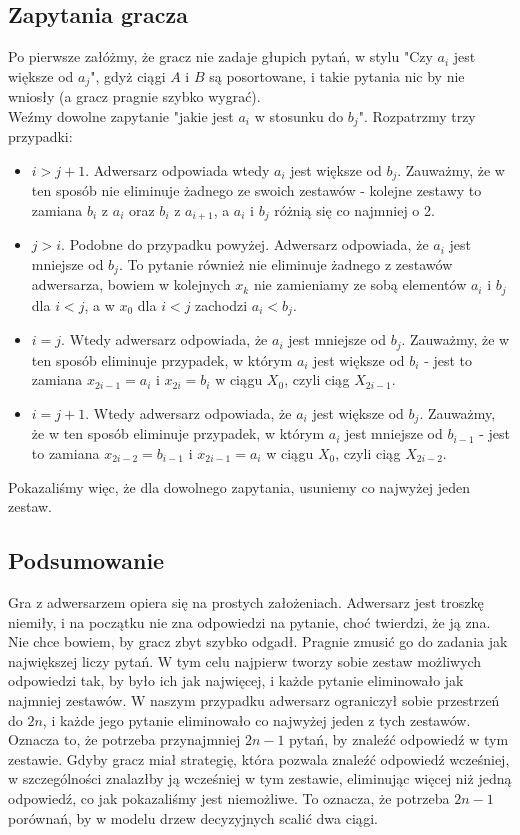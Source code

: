 \documentclass[a4paper]{article}
\begin{document}
\subsection*{Zapytania gracza}
Po pierwsze załóżmy, że gracz nie zadaje głupich pytań, w stylu "Czy $a_i$ jest większe od $a_j$", gdyż ciągi $A$ i $B$ są posortowane, i takie pytania nic by nie wniosły (a gracz pragnie szybko wygrać).\\
Weźmy dowolne zapytanie "jakie jest $a_i$ w stosunku do $b_j$". Rozpatrzmy trzy przypadki:\\
\begin{itemize}
\item $i>j+1$. Adwersarz odpowiada wtedy $a_i$ jest większe od $b_j$. Zauważmy, że w ten sposób nie eliminuje żadnego ze swoich zestawów - kolejne zestawy to zamiana $b_i$ z $a_i$ oraz $b_i$ z $a_{i+1}$, a $a_i$ i $b_j$ różnią się co najmniej o 2.
\item $j>i$. Podobne do przypadku powyżej. Adwersarz odpowiada, że $a_i$ jest mniejsze od $b_j$. To pytanie również nie eliminuje żadnego z zestawów adwersarza, bowiem w kolejnych $x_k$ nie zamieniamy ze sobą elementów $a_i$ i $b_j$ dla $i<j$, a w $x_0$ dla $i<j$ zachodzi $a_i<b_j$.
\item $i=j$. Wtedy adwersarz odpowiada, że $a_i$ jest mniejsze od $b_j$. Zauważmy, że w ten sposób eliminuje przypadek, w którym $a_i$ jest większe od $b_i$ - jest to zamiana $x_{2i-1}=a_i$ i $x_{2i}=b_i$ w ciągu $X_0$, czyli ciąg $X_{2i-1}$.
\item $i=j+1$. Wtedy adwersarz odpowiada, że $a_i$ jest większe od $b_j$. Zauważmy, że w ten sposób eliminuje przypadek, w którym $a_i$ jest mniejsze od $b_{i-1}$ - jest to zamiana $x_{2i-2}=b_{i-1}$ i $x_{2i-1}=a_i$ w ciągu $X_0$, czyli ciąg $X_{2i-2}$.
\end{itemize} 
Pokazaliśmy więc, że dla dowolnego zapytania, usuniemy co najwyżej jeden zestaw.

\subsection*{Podsumowanie}
Gra z adwersarzem opiera się na prostych założeniach. Adwersarz jest troszkę niemiły, i na początku nie zna odpowiedzi na pytanie, choć twierdzi, że ją zna. Nie chce bowiem, by gracz zbyt szybko odgadł. Pragnie zmusić go do zadania jak największej liczy pytań. W tym celu najpierw tworzy sobie zestaw możliwych odpowiedzi tak, by było ich jak najwięcej, i każde pytanie eliminowało jak najmniej zestawów. W naszym przypadku adwersarz ograniczył sobie przestrzeń do $2n$, i każde jego pytanie eliminowało co najwyżej jeden z tych zestawów. Oznacza to, że potrzeba przynajmniej $2n-1$ pytań, by znaleźć odpowiedź w tym zestawie. Gdyby gracz miał strategię, która pozwala znaleźć odpowiedź wcześniej, w szczególności znalazłby ją wcześniej w tym zestawie, eliminując więcej niż jedną odpowiedź, co jak pokazaliśmy jest niemożliwe. To oznacza, że potrzeba $2n-1$ porównań, by w modelu drzew decyzyjnych scalić dwa ciągi.



 
\end{document}
